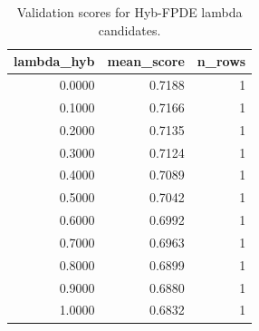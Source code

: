 \begin{table}[t]
\caption{Validation scores for Hyb-FPDE lambda candidates.}
\label{tab:lambda_distribution_computed}
\centering
\begin{tabular}{rrr}
\toprule
lambda\_hyb & mean\_score & n\_rows \\
\midrule
0.0000 & 0.7188 & 1 \\
0.1000 & 0.7166 & 1 \\
0.2000 & 0.7135 & 1 \\
0.3000 & 0.7124 & 1 \\
0.4000 & 0.7089 & 1 \\
0.5000 & 0.7042 & 1 \\
0.6000 & 0.6992 & 1 \\
0.7000 & 0.6963 & 1 \\
0.8000 & 0.6899 & 1 \\
0.9000 & 0.6880 & 1 \\
1.0000 & 0.6832 & 1 \\
\bottomrule
\end{tabular}

\end{table}
